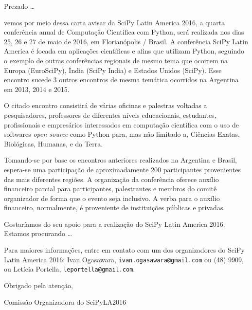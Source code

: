 \documentclass[a4paper,12pt]{article}
\begin{document}
\thispagestyle{empty}
Prezado \ldots

vemos por meio dessa carta avisar da SciPy Latin America 2016, a quarta conferência anual de Computação Científica com Python, será realizada nos dias 25, 26 e 27 de maio de 2016, em Florianópolis / Brasil.
A conferência SciPy Latin America é focada em aplicações científicas e afins que
utilizam Python, seguindo o exemplo de outras conferências regionais de mesmo tema que ocorrem na Europa (EuroSciPy), Índia (SciPy India) e Estados Unidos (SciPy). Esse encontro sucede 3 outros encontros de mesma temática ocorridos na Argentina em 2013, 2014 e 2015.

O citado encontro consistirá de várias oficinas e palestras voltadas a
pesquisadores, professores de diferentes níveis educacionais, estudantes,
profissionais e empresários interessados em
computação científica com o uso de softwares \emph{open source} como Python para, mas não limitado a, Ciências Exatas, Biológicas, Humanas, e da Terra.

Tomando-se por base os encontros anteriores realizados na Argentina e Brasil, espera-se uma participação de aproximadamente 200 participantes provenientes das mais diferentes regiões.
A organização da conferência oferece auxílio financeiro parcial para participantes,
palestrantes e membros do comitê organizador de forma que o evento seja inclusivo.
A verba para o auxílio financeiro, normalmente, é proveniente
de instituições públicas e privadas.

Gostaríamos do seu apoio para a realização do SciPy Latin America 2016.
Estamos procurando \ldots

Para maiores informações, entre em contato com um dos organizadores do SciPy
Latin America 2016: Ivan Ogasawara, \texttt{ivan.ogasawara@gmail.com} ou (48)
9909, ou Letícia Portella, \texttt{leportella@gmail.com}.

\vspace{1cm}

Obrigado pela atenção,

\vspace{0.5cm}

Comissão Organizadora do SciPyLA2016
\end{document}
